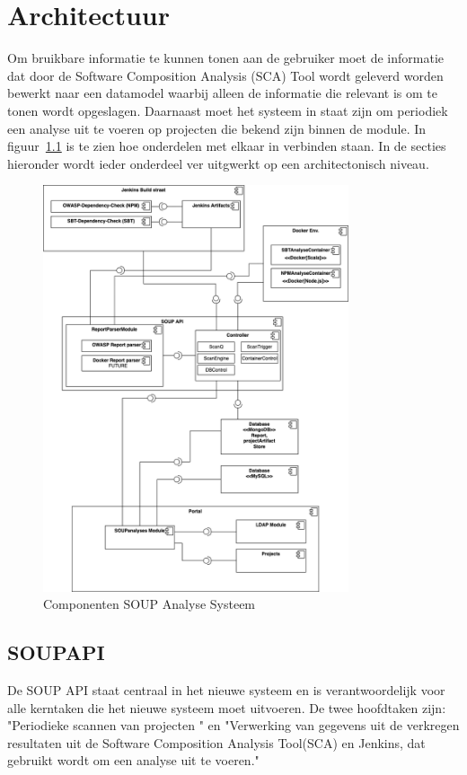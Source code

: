 \chapter{Architectuur}\label{ch:Architectuur}
Om bruikbare informatie te kunnen tonen aan de gebruiker moet de informatie dat door de Software Composition Analysis (SCA) Tool wordt geleverd worden bewerkt naar een datamodel waarbij alleen de informatie die relevant is om te tonen wordt opgeslagen. Daarnaast moet het systeem in staat zijn om periodiek een analyse uit te voeren op projecten die bekend zijn binnen de module. In figuur~\ref{fig:SOUP-Components} is te zien hoe onderdelen met elkaar in verbinden staan.
In de secties hieronder wordt ieder onderdeel ver uitgwerkt op een architectonisch niveau.

\begin{figure}[bth]
    \myfloatalign
    \includegraphics[width=9cm]{gfx/UMLcomponentDiagram}
    \caption{Componenten SOUP Analyse Systeem}
    \label{fig:SOUP-Components}
\end{figure}

\section{SOUPAPI}\label{sec:soupapi}
De SOUP API staat centraal in het nieuwe systeem en is verantwoordelijk voor alle kerntaken die het nieuwe systeem moet uitvoeren. De twee hoofdtaken zijn: "Periodieke scannen van projecten " en "Verwerking van gegevens uit de verkregen resultaten uit de Software Composition Analysis Tool(SCA) en Jenkins, dat gebruikt wordt om een analyse uit te voeren."

